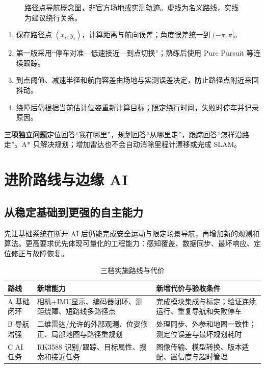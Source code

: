 \documentclass[UTF8,a4paper,zihao=-4,fontset=fandol]{ctexart}
\newcommand{\note}[2]{\par\smallskip\noindent\colorbox{Pale}{\parbox{\dimexpr\linewidth-2\fboxsep\relax}{\small\textbf{\color{Teal}#1}\quad #2}}\par\smallskip}
\newcommand{\nextpage}{\clearpage}
\begin{document}
\begin{figure}[H]\centering
{}
\caption{路径点导航概念图，非官方场地或实测轨迹。虚线为名义路线，实线为建议绕行关系。}\label{fig:path}
\end{figure}

\begin{enumerate}
\item 保存路径点 $(x_i,y_i)$，计算距离与航向误差；角度误差统一到 $(-\pi,\pi]$。
\item 第一版采用“停车对准—低速接近—到点切换”；熟练后使用 Pure Pursuit 等连续跟踪。
\item 到点阈值、减速半径和航向容差由场地与实测误差决定，防止路径点附近来回抖动。
\item 绕障后仍根据当前估计位姿重新计算目标；限定绕行时间，失败时停车并记录原因。
\end{enumerate}

\note{三项独立问题}{定位回答“我在哪里”，规划回答“从哪里走”，跟踪回答“怎样沿路走”。A* 只解决规划；增加雷达也不会自动消除里程计漂移或完成 SLAM。}

\nextpage
\section{进阶路线与边缘 AI}\label{sec:advanced}
\subsection{从稳定基础到更强的自主能力}

先让基础系统在断开 AI 后仍能完成安全运动与限定场景导航，再增加新的观测和算法。更高要求优先体现可量化的工程能力：感知覆盖、数据同步、最坏响应、定位修正与故障恢复。

\begin{table}[H]\small
\caption{三档实施路线与代价}
\begin{tabularx}{\linewidth}{@{}L{2.3cm}Y Y@{}}\toprule
\textbf{路线} & \textbf{新增能力} & \textbf{新增代价与验收条件}\\\midrule
A 基础闭环 & 相机+IMU显示、编码器闭环、测距绕障、短路线多路径点 & 完成模块集成与标定；验证连续运行、重复导航和失败停车\\
B 导航增强 & 二维雷达/允许的外部观测、位姿修正、局部地图与路径重规划 & 处理同步、外参和地图一致性；测定位误差与最坏规划耗时\\
C AI 任务 & RK3588 识别/跟踪、目标属性、搜索和接近任务 & 图像传输、模型转换、版本适配、置信度与超时管理\\\bottomrule
\end{tabularx}
\end{table}
\end{document}
